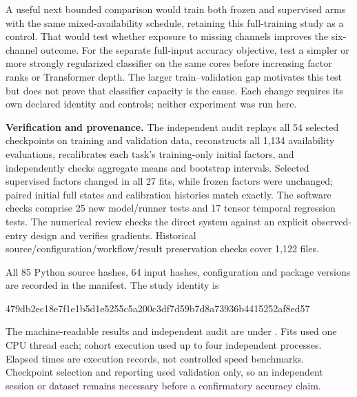 A useful next bounded comparison would train both frozen and supervised arms
with the same mixed-availability schedule, retaining this full-training study
as a control. That would test whether exposure to missing channels improves
the six-channel outcome. For the separate full-input accuracy objective,
test a simpler or more strongly regularized classifier on the same cores before
increasing factor ranks or Transformer depth. The larger train--validation gap
motivates this test but does not prove that classifier capacity is the cause.
Each change
requires its own declared identity and controls; neither experiment was run here.

\textbf{Verification and provenance.} The independent audit replays all 54
selected checkpoints on training and validation data, reconstructs all 1,134
availability evaluations, recalibrates each task's training-only initial factors,
and independently checks aggregate means and bootstrap intervals. Selected
supervised factors changed in all 27 fits, while frozen factors were unchanged;
paired initial full states and calibration histories match exactly. The software
checks comprise 25 new model/runner tests and 17 tensor temporal regression tests.
The numerical review checks the direct system against an explicit observed-entry
design and verifies gradients. Historical source/configuration/workflow/result
preservation checks cover 1,122 files.

All 85 Python source hashes, 64 input hashes, configuration and package versions
are recorded in the manifest. The study identity is
\begin{center}{\scriptsize\ttfamily
479db2ec18e7f1e1b5d1e5255c5a200c3df7d59b7d8a73936b4415252af8ed57}
\end{center}
The machine-readable results and independent audit are under
. Fits used one CPU thread each;
cohort execution used up to four independent processes. Elapsed times are
execution records, not controlled speed benchmarks. Checkpoint selection and
reporting used validation only, so an independent session or dataset remains
necessary before a confirmatory accuracy claim.
